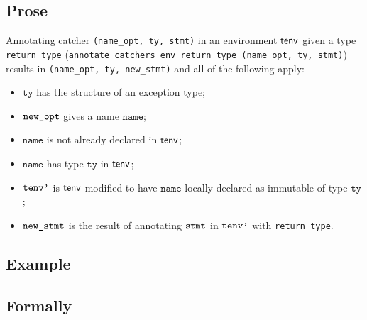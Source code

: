 \documentclass{book}
\newcommand\todocomment[1]{}
\newcommand\annotaterel[0]{\hyperlink{def-annotaterel}{\textsf{type}}}
\newcommand\typearrow[0]{\xrightarrow{\annotaterel}}
\newcommand\annotateblock[1]{\texttt{annotate\_block}(#1)}
\newcommand\annotatecatcher[1]{\texttt{annotate\_catcher}(#1)}
\newcommand\checkvarnotinenv[1]{\texttt{check\_var\_not\_in\_env}(#1)}
\newcommand\tty[0]{\texttt{ty}}
\newcommand\name[0]{\texttt{name}}
\begin{document}
  \subsection{Prose}
   Annotating catcher \texttt{(name\_opt, ty, stmt)} in an environment
$\textsf{tenv}$ given a type \texttt{return\_type} (\texttt{annotate\_catchers env return\_type (name\_opt, ty, stmt)})
results in \texttt{(name\_opt, ty, new\_stmt)} and all of the following apply:
   \begin{itemize}
   \item $\tty$ has the structure of an exception type;
   \item $\texttt{new\_opt}$ gives a name $\name$;
   \item $\name$ is not already declared in $\textsf{tenv}$;
   \item $\name$ has type $\tty$ in $\textsf{tenv}$; \todocomment{ROMAN: doesn't appear in the code}
   \item $\texttt{tenv'}$ is $\textsf{tenv}$ modified to have $\name$ locally declared as immutable of type $\tty$;
   \item $\texttt{new\_stmt}$ is the result of annotating $\texttt{stmt}$ in $\texttt{tenv'}$ with \texttt{return\_type}.
   \end{itemize}

  \subsection{Example}



\begin{emptyformal}
    \subsection{Formally}
\end{emptyformal}
\end{document}

